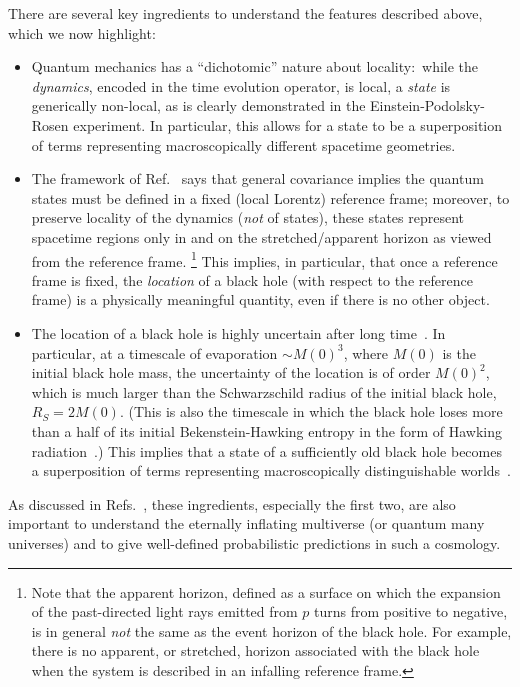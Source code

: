 \documentclass[12pt]{article}
\begin{document}
There are several key ingredients to understand the features described 
above, which we now highlight:
%
\begin{itemize}
%
\item
Quantum mechanics has a ``dichotomic'' nature about locality:\ while 
the {\it dynamics}, encoded in the time evolution operator, is local, 
a {\it state} is generically non-local, as is clearly demonstrated in 
the Einstein-Podolsky-Rosen experiment.  In particular, this allows 
for a state to be a superposition of terms representing macroscopically 
different spacetime geometries.
%
\item
The framework of Ref.~\cite{Nomura:2011rb} says that general covariance 
implies the quantum states must be defined in a fixed (local Lorentz) 
reference frame; moreover, to preserve locality of the dynamics ({\it not} 
of states), these states represent spacetime regions only in and on the 
stretched/apparent horizon as viewed from the reference frame.%
\footnote{Note that the apparent horizon, defined as a surface on which 
 the expansion of the past-directed light rays emitted from $p$ turns 
 from positive to negative, is in general {\it not} the same as the 
 event horizon of the black hole.  For example, there is no apparent, 
 or stretched, horizon associated with the black hole when the system 
 is described in an infalling reference frame.}
This implies, in particular, that once a reference frame is fixed, 
the {\it location} of a black hole (with respect to the reference frame) 
is a physically meaningful quantity, even if there is no other object.
%
\item
The location of a black hole is highly uncertain after long 
time~\cite{Page:1979tc}.  In particular, at a timescale of evaporation 
$\sim M(0)^3$, where $M(0)$ is the initial black hole mass, the uncertainty 
of the location is of order $M(0)^2$, which is much larger than the 
Schwarzschild radius of the initial black hole, $R_S = 2M(0)$.  (This 
is also the timescale in which the black hole loses more than a half 
of its initial Bekenstein-Hawking entropy in the form of Hawking 
radiation~\cite{Page:1993wv}.)  This implies that a state of a sufficiently 
old black hole becomes a superposition of terms representing macroscopically 
distinguishable worlds~\cite{Nomura:2012sw}.
%
\end{itemize}
%
As discussed in Refs.~\cite{Nomura:2011dt,Nomura:2012zb}, these ingredients, 
especially the first two, are also important to understand the eternally 
inflating multiverse (or quantum many universes) and to give well-defined 
probabilistic predictions in such a cosmology.
\end{document}
